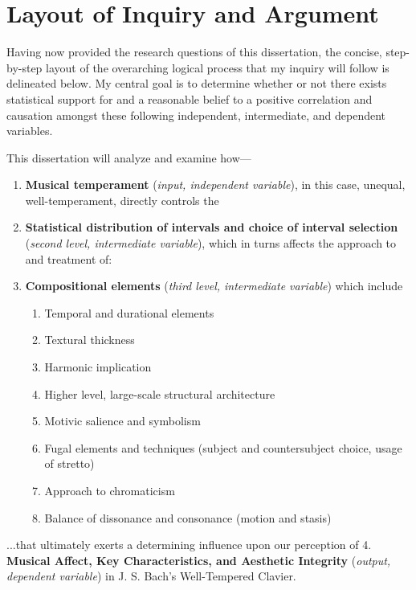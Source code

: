     \section{Layout of Inquiry and
Argument}\label{layout-of-inquiry-and-argument}

Having now provided the research questions of this dissertation, the
concise, step-by-step layout of the overarching logical process that my
inquiry will follow is delineated below. My central goal is to determine
whether or not there exists statistical support for and a reasonable
belief to a positive correlation and causation amongst these following
independent, intermediate, and dependent variables.

This dissertation will analyze and examine how---

\begin{enumerate}
\def\labelenumi{\arabic{enumi}.}
\tightlist
\item
  \textbf{Musical temperament} (\emph{input, independent variable}), in
  this case, unequal, well-temperament, directly controls the
\item
  \textbf{Statistical distribution of intervals and choice of interval
  selection} (\emph{second level, intermediate variable}), which in
  turns affects the approach to and treatment of:
\item
  \textbf{Compositional elements} (\emph{third level, intermediate
  variable}) which include

  \begin{enumerate}
  \def\labelenumii{\arabic{enumii}.}
  \tightlist
  \item
    Temporal and durational elements
  \item
    Textural thickness
  \item
    Harmonic implication
  \item
    Higher level, large-scale structural architecture
  \item
    Motivic salience and symbolism
  \item
    Fugal elements and techniques (subject and countersubject choice,
    usage of stretto)
  \item
    Approach to chromaticism
  \item
    Balance of dissonance and consonance (motion and stasis)
  \end{enumerate}
\end{enumerate}

...that ultimately exerts a determining influence upon our perception of
4. \textbf{Musical Affect, Key Characteristics, and Aesthetic Integrity}
(\emph{output, dependent variable}) in J. S. Bach's Well-Tempered
Clavier.

